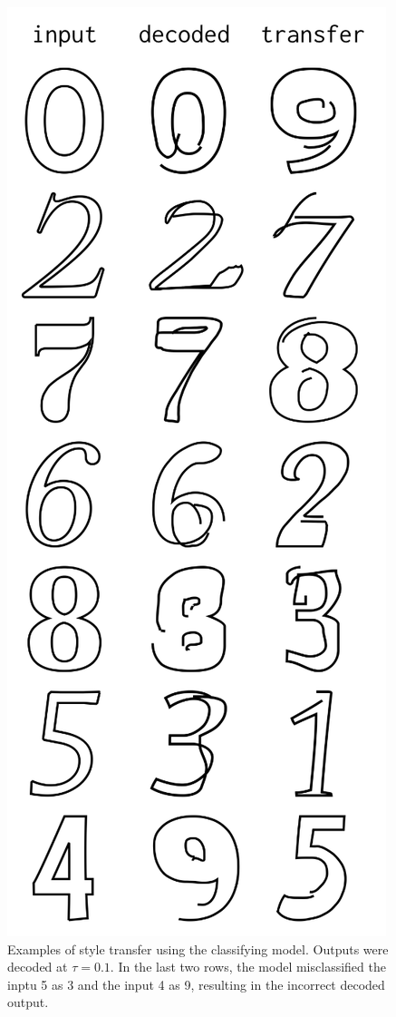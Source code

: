 \begin{figure}[h]
    \centering
	\includegraphics[height=0.9\textheight]{figures/style_trans}
    \caption[Examples of style transfer using the classifying model]
    {Examples of style transfer using the classifying model.
    Outputs were decoded at $\tau=0.1$.
    In the last two rows, the model misclassified the inptu 5 as 3 and the input 4 as 9, resulting in the incorrect decoded output.
    \label{fig:style-trans}}
\end{figure}
